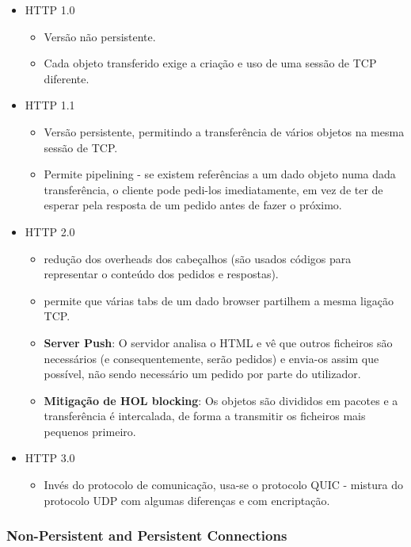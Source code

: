 \documentclass[12pt]{article}
\begin{document}
\begin{itemize}
    \item HTTP 1.0
        \begin{itemize}[topsep=0pt]
            \item Versão não persistente.
            \item Cada objeto transferido exige a criação e uso de uma sessão de TCP diferente.
        \end{itemize}
    \item HTTP 1.1
        \begin{itemize}[topsep=0pt]
            \item Versão persistente, permitindo a transferência de vários objetos na mesma sessão de TCP.
            \item Permite pipelining - se existem referências a um dado objeto numa dada transferência, o cliente pode pedi-los imediatamente, em vez de ter de esperar pela resposta de um pedido antes de fazer o próximo.
        \end{itemize}
    \item HTTP 2.0
        \begin{itemize}[topsep=0pt]
            \item redução dos overheads dos cabeçalhos (são usados códigos para representar o conteúdo dos pedidos e respostas).
            \item permite que várias tabs de um dado browser partilhem a mesma ligação TCP.
            \item \textbf{Server Push}: O servidor analisa o HTML e vê que outros ficheiros são necessários (e consequentemente, serão pedidos) e envia-os assim que possível, não sendo necessário um pedido por parte do utilizador.
            \item \textbf{Mitigação de HOL blocking}: Os objetos são divididos em pacotes e a transferência é intercalada, de forma a transmitir os ficheiros mais pequenos primeiro.
        \end{itemize}
    \item HTTP 3.0
        \begin{itemize}[topsep=0pt]
            \item Invés do protocolo de comunicação, usa-se o protocolo QUIC - mistura do protocolo UDP com algumas diferenças e com encriptação.
        \end{itemize}
\end{itemize}

\subsubsection{Non-Persistent and Persistent Connections}
\end{document}
